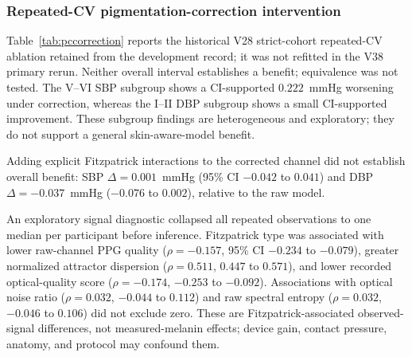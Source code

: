 \documentclass[journal]{IEEEtran}
\begin{document}
\subsubsection{Repeated-CV pigmentation-correction intervention}
Table~\ref{tab:pccorrection} reports the historical V28 strict-cohort repeated-CV ablation retained from the development record; it was not refitted in the V38 primary rerun. Neither overall interval establishes a benefit; equivalence was not tested. The V--VI SBP subgroup shows a CI-supported $0.222$~mmHg worsening under correction, whereas the I--II DBP subgroup shows a small CI-supported improvement. These subgroup findings are heterogeneous and exploratory; they do not support a general skin-aware-model benefit.
\begin{table}[t]
\centering
\caption{Pigmentation-Corrected vs.\ Raw Channel in Repeated Participant CV}
\label{tab:pccorrection}
\scriptsize
{}
\end{table}
Adding explicit Fitzpatrick interactions to the corrected channel did not establish overall benefit: SBP $\Delta=0.001$~mmHg (95\% CI $-0.042$ to $0.041$) and DBP $\Delta=-0.037$~mmHg ($-0.076$ to $0.002$), relative to the raw model.

An exploratory signal diagnostic collapsed all repeated observations to one median per participant before inference. Fitzpatrick type was associated with lower raw-channel PPG quality ($\rho=-0.157$, 95\% CI $-0.234$ to $-0.079$), greater normalized attractor dispersion ($\rho=0.511$, $0.447$ to $0.571$), and lower recorded optical-quality score ($\rho=-0.174$, $-0.253$ to $-0.092$). Associations with optical noise ratio ($\rho=0.032$, $-0.044$ to $0.112$) and raw spectral entropy ($\rho=0.032$, $-0.046$ to $0.106$) did not exclude zero. These are Fitzpatrick-associated observed-signal differences, not measured-melanin effects; device gain, contact pressure, anatomy, and protocol may confound them.
\end{document}
